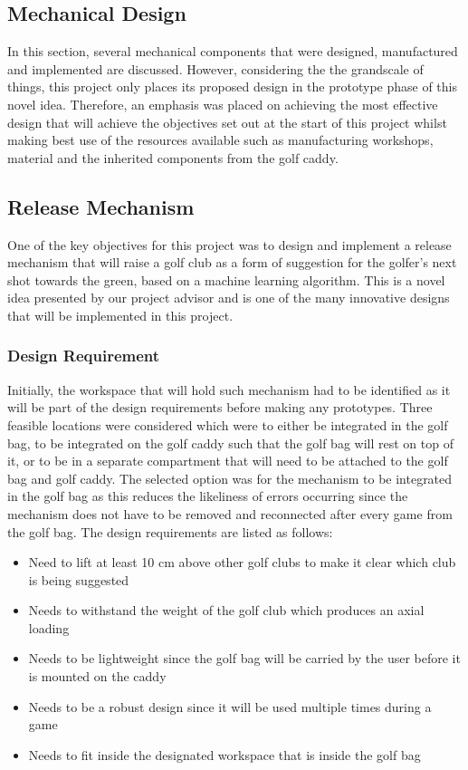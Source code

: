\documentclass[11pt,landscape]{article}
\begin{document}
\begin{multicols}{2}

\section{Mechanical Design}
    In this section, several mechanical components that were designed,
    manufactured and implemented are discussed. However, considering the the
    grandscale of things, this project only places its proposed design in the
    prototype phase of this novel idea. Therefore, an emphasis was placed on
    achieving the most effective design that will achieve the objectives set out
    at the start of this project whilst making best use of the resources
    available such as manufacturing workshops, material and the inherited
    components from the golf caddy. 
    
    \subsection{Release Mechanism}
    One of the key objectives for this project was to design and implement a
    release mechanism that will raise a golf club as a form of suggestion for
    the golfer’s next shot towards the green, based on a machine learning
    algorithm. This is a novel idea presented by our project advisor and is one
    of the many innovative designs that will be implemented in this project.
    
    \subsubsection{Design Requirement}
    Initially, the workspace that will hold such mechanism had to be identified
    as it will be part of the design requirements before making any prototypes.
    Three feasible locations were considered which were to either be integrated
    in the golf bag, to be integrated on the golf caddy such that the golf bag
    will rest on top of it, or to be in a separate compartment that will need to
    be attached to the golf bag and golf caddy. The selected option was for the
    mechanism to be integrated in the golf bag as this reduces the likeliness of
    errors occurring since the mechanism does not have to be removed and
    reconnected after every game from the golf bag. The design requirements are
    listed as follows:
    
    
    \begin{itemize}
    \item Need to lift at least 10 cm above other golf clubs to make it clear
    which club is being suggested
    \item Needs to withstand the weight of the golf club which produces an axial
    loading
    \item Needs to be lightweight since the golf bag will be carried by the user
    before it is mounted on the caddy
    \item Needs to be a robust design since it will be used multiple times
    during a game
    \item Needs to fit inside the designated workspace that is inside the golf
    bag
    \end{itemize}
    

\end{multicols}
\end{document}
